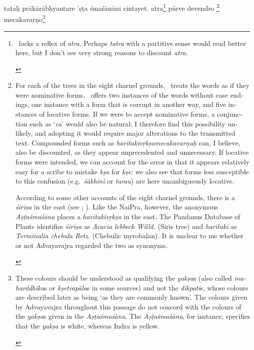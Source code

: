 \documentclass[naipra.tex]{subfiles}
\begin{document}
\begin{sanskrit}
\pstart
tataḥ prākārābhyantare 'ṣṭa śmaśānāni cintayet.
atra\footnote{
	\begin{english}%
		\TIB\ lacks a reflex of \emph{atra}.
		Perhaps \emph{tatra} with a partitive sense would read better here, but I don't see very strong reasons to discount \emph{atra}.
	\end{english}
} pūrve devendro \footnote{
	\begin{english}%
		For each of the trees in the eight charnel grounds, \TIB\ treats the words as if they were nominative forms.
		\MSN\ offers two instances of the words without case endings, one instance with a form that is corrupt in another way, and five instances of locative forms.
		If we were to accept nominative forms, a conjunction such as `\emph{ca}' would also be natural; I therefore find this possibility unlikely, and adopting it would require major alterations to the transmitted text. 
		Compounded forms such as \emph{harītakīvṛkṣamecakavarṇaḥ} can, I believe, also be discounted, as they appear unprecedented and unnecessary.
		If locative forms were intended, we can account for the error in that it appears relatively easy for a scribe to mistake \emph{kṣa} for \emph{kṣe}; we also see that forms less susceptible to this confusion (e.g.\ \emph{śākhini} or \emph{tarau}) are here unambiguously locative. 

		According to some other accounts of the eight charnel grounds, there is a \emph{śirīṣa} in the east (see \cite[vol.\ 2 739–740]{gerloff2020}; \cite[140]{english2002}).
		Like the NaiPra, however, the anonymous \emph{Aṣṭaśmaśāna} places a \emph{harītakīvṛkṣa} in the east.
		The Pandanus Database of Plants identifies \emph{śirīṣa} as \emph{Acacia lebbeck Willd.} (Siris tree) and \emph{harītakī} as \emph{Terminalia chebula Retz.} (Chebulic myrobalan).
		It is unclear to me whether or not Advayavajra regarded the two as synonyms.
	\end{english}
} mecakavarṇo\footnote{
	\begin{english}%
		These colours should be understood as qualifying the \emph{yakṣa}s (also called \emph{maharddhika}s or \emph{kṣetrapāla}s in some sources) and not the \emph{dikpati}s, whose colours are described later as being `as they are commonly known'.
		The colours given by Advayavajra throughout this passage do not concord with the colours of the \emph{yakṣa}s given in the \emph{Aṣṭaśmaśāna}.
		The \emph{Aṣṭaśmaśāna}, for instance, specifies that the \emph{yakṣa} is white, whereas Indra is yellow.


\end{english}}
\end{sanskrit}
\end{document}
